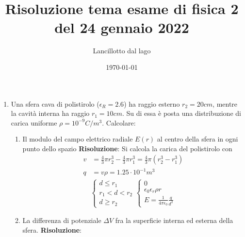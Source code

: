 \documentclass{article}
\title{Risoluzione tema esame di fisica 2 del 24 gennaio 2022}
\author{Lancillotto dal lago}
\date{\today}
\begin{document}
\maketitle

\begin{enumerate}
    \item Una sfera cava di polistirolo ($\epsilon_R = 2.6$) ha raggio esterno $r_2 = 20cm$, mentre la cavità interna ha raggio $r_1=10cm$.
    Su di essa è posta una distribuzione di carica uniforme $\rho=10^{-9} C/m^3$. Calcolare:
    \begin{enumerate}

        \item Il modulo del campo elettrico radiale $E(r)$ al centro della sfera in ogni punto dello spazio
        \newline
        \textbf{Risoluzione}: Si calcola la carica del polistirolo con
        \begin{align}
            v & = \frac{4}{3} \pi r_{2}^{3} - \frac{4}{3} \pi r_{1}^{3} = \frac{4}{3} \pi (r_{2}^{3} - r_{1}^{3}) \\
            q & = v \rho = 1.25 \cdot 10^{-1} m^3
        \end{align} 
        \begin{align*}
            \begin{cases}
                d \leq r_1 \\
                r_1 < d < r_2 \\
                d \geq r_2
            \end{cases}
            \begin{cases}
                0 \\
                \epsilon_0 \epsilon_r \rho r \\
                E = \frac{1}{4 \pi \epsilon_0} \frac{q}{d^2}
            \end{cases}
        \end{align*}

        \item La differenza di potenziale $\Delta V$ fra la superficie interna ed esterna della sfera.
        \newline
        \textbf{Risoluzione}:


\end{enumerate}
\end{enumerate}
\end{document}
